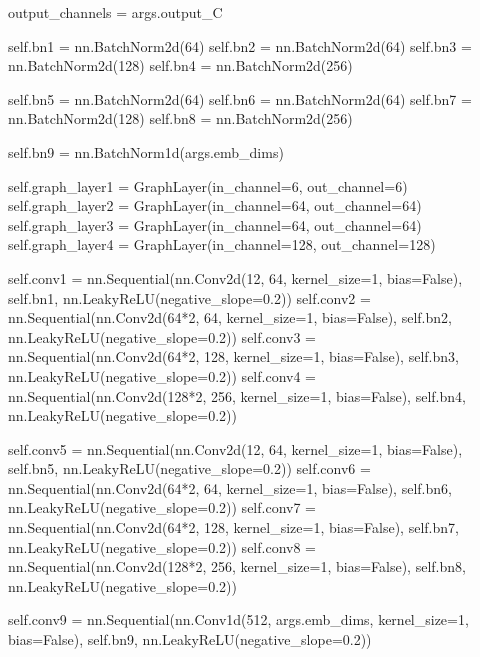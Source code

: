         output_channels = args.output_C
        
        self.bn1 = nn.BatchNorm2d(64)
        self.bn2 = nn.BatchNorm2d(64)
        self.bn3 = nn.BatchNorm2d(128)
        self.bn4 = nn.BatchNorm2d(256)
        
        self.bn5 = nn.BatchNorm2d(64)
        self.bn6 = nn.BatchNorm2d(64)
        self.bn7 = nn.BatchNorm2d(128)
        self.bn8 = nn.BatchNorm2d(256)
                
        self.bn9 = nn.BatchNorm1d(args.emb_dims)

        self.graph_layer1 = GraphLayer(in_channel=6, out_channel=6)
        self.graph_layer2 = GraphLayer(in_channel=64, out_channel=64)
        self.graph_layer3 = GraphLayer(in_channel=64, out_channel=64)
        self.graph_layer4 = GraphLayer(in_channel=128, out_channel=128)

        self.conv1 = nn.Sequential(nn.Conv2d(12, 64, kernel_size=1, bias=False),
                                   self.bn1,
                                   nn.LeakyReLU(negative_slope=0.2))
        self.conv2 = nn.Sequential(nn.Conv2d(64*2, 64, kernel_size=1, bias=False),
                                   self.bn2,
                                   nn.LeakyReLU(negative_slope=0.2))
        self.conv3 = nn.Sequential(nn.Conv2d(64*2, 128, kernel_size=1, bias=False),
                                   self.bn3,
                                   nn.LeakyReLU(negative_slope=0.2))
        self.conv4 = nn.Sequential(nn.Conv2d(128*2, 256, kernel_size=1, bias=False),
                                   self.bn4,
                                   nn.LeakyReLU(negative_slope=0.2))
        
        
        self.conv5 = nn.Sequential(nn.Conv2d(12, 64, kernel_size=1, bias=False),
                                   self.bn5,
                                   nn.LeakyReLU(negative_slope=0.2))
        self.conv6 = nn.Sequential(nn.Conv2d(64*2, 64, kernel_size=1, bias=False),
                                   self.bn6,
                                   nn.LeakyReLU(negative_slope=0.2))
        self.conv7 = nn.Sequential(nn.Conv2d(64*2, 128, kernel_size=1, bias=False),
                                   self.bn7,
                                   nn.LeakyReLU(negative_slope=0.2))
        self.conv8 = nn.Sequential(nn.Conv2d(128*2, 256, kernel_size=1, bias=False),
                                   self.bn8,
                                   nn.LeakyReLU(negative_slope=0.2))
        
        
        self.conv9 = nn.Sequential(nn.Conv1d(512, args.emb_dims, kernel_size=1, bias=False),
                                   self.bn9,
                                   nn.LeakyReLU(negative_slope=0.2))
        
